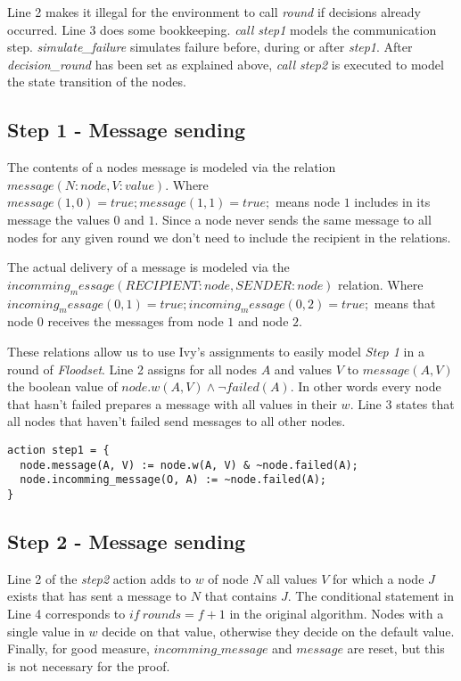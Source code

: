 \documentclass[fleqn]{article}
\begin{document}
Line 2 makes it illegal for the environment to call \textit{round} if decisions already occurred.
Line 3 does some bookkeeping.
\textit{call step1} models the communication step. \textit{simulate\_failure} simulates failure before, during
or after \textit{step1}. After \textit{decision\_round} has been set as explained above, \textit{call step2} is
executed to model the state transition of the nodes.


\subsection{Step 1 - Message sending}
The contents of a nodes message is modeled via the relation $message(N:node, V:value)$. Where
$message(1, 0) = true; message(1, 1) = true;$ means node $1$ includes in its message the values $0$ and $1$.
Since a node never sends the same message to all nodes for any given round we don't need to include the
recipient in the relations.

The actual delivery of a message is modeled via the $incomming_message(RECIPIENT:node, SENDER:node)$ relation. Where $incoming_message(0, 1) = true; incoming_message(0, 2) = true;$ means that node $0$ receives the messages from node $1$ and node $2$.

These relations allow us to use Ivy's assignments to easily model \textit{Step 1} in a round of \textit{Floodset}.
Line 2 assigns for all nodes $A$ and values $V$ to $message(A,V)$ the boolean value of $node.w(A,V) \land \neg failed(A)$. In other words every node that hasn't failed prepares a message with all values in their $w$. Line 3 states that all nodes that haven't failed send messages to all other nodes.

\begin{mdframed}[backgroundcolor=light-gray, roundcorner=10pt,leftmargin=1, rightmargin=1, innerleftmargin=15, innertopmargin=15,innerbottommargin=15, outerlinewidth=1, linecolor=light-gray]
\begin{lstlisting}
action step1 = {
  node.message(A, V) := node.w(A, V) & ~node.failed(A);
  node.incomming_message(O, A) := ~node.failed(A);
}
\end{lstlisting}
\end{mdframed}

\subsection{Step 2 - Message sending}

Line 2 of the \textit{step2} action adds to $w$ of node $N$ all values $V$ for which a node $J$ exists that has sent a message to $N$ that contains $J$.
The conditional statement in Line 4 corresponds to $if\ rounds = f+1$ in the original algorithm. Nodes with a single value in $w$ decide on that value, otherwise
they decide on the default value.
Finally, for good measure, $incomming\_message$ and $message$ are reset, but this is not necessary for the proof.
\end{document}
